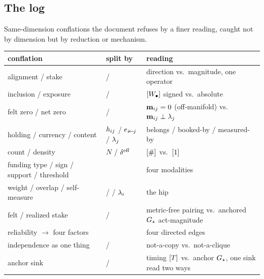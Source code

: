 \documentclass[../main]{subfiles}
\begin{document}
\clearpage
\subsection{The \texorpdfstring{}{g:split} log}
\label{subsec:log:split}

Same-dimension conflations the document refuses by a finer reading, caught not by dimension
but by reduction or mechanism.

\begin{table}[htbp]
  \centering
  \begin{tabularx}{\textwidth}{@{} L l L @{}}
    \toprule
    \textbf{conflation} & \textbf{split by} & \textbf{reading} \\
    \midrule
    alignment / stake &  / 
      & direction vs.\ magnitude, one operator \\
    inclusion / exposure &  / 
      & $[W\sb{\bullet}]$ signed vs.\ absolute \\
    felt zero / net zero &  / 
      & $\mathbf{m}\sb{ ij }=0$ (off-manifold) vs.\ $\mathbf{m}\sb{ ij }\perp\lambda\sb{j}$ \\
    holding / currency / content & $h\sb{ ij }$ / $e\sb{ \ensuremath{i\!\leftarrow\!j} }$ / $\lambda\sb{j}$
      & belongs / booked-by / measured-by \\
    count / density & $N$ / $\effdensity$ & $[\#]$ vs.\ $[1]$ \\
    funding type / sign / support / threshold &  & four modalities \\
    weight / overlap / self-measure &  /  / $\lambda\sb{i}$
      & the hip \\
    felt / realized stake &  / 
      & metric-free pairing vs.\ anchored $G\sb{\star}$ act-magnitude \\
    reliability $\to$ four factors
      &    
      & four directed edges \\
    independence as one thing &  / 
      & not-a-copy vs.\ not-a-clique \\
    anchor sink &  / 
      & timing $[T]$ vs.\ anchor $G\sb{\star}$, one sink read two ways \\
    \bottomrule
  \end{tabularx}
\end{table}
\end{document}
